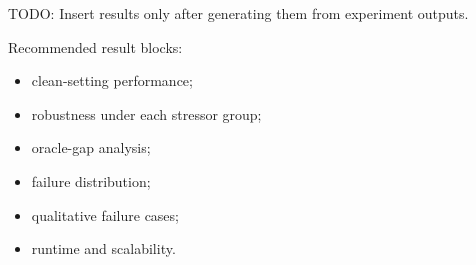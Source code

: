 TODO: Insert results only after generating them from experiment outputs.

Recommended result blocks:
\begin{itemize}
    \item clean-setting performance;
    \item robustness under each stressor group;
    \item oracle-gap analysis;
    \item failure distribution;
    \item qualitative failure cases;
    \item runtime and scalability.
\end{itemize}
